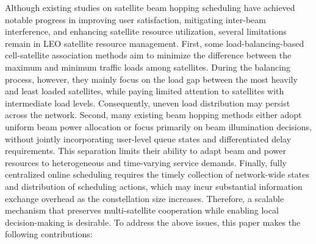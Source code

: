 \documentclass[journal]{IEEEtran}
\newcommand{\revbegin}[1]{\color{revisionblue}\ignorespaces}
\newcommand{\revend}[1]{\color{black}\ignorespaces}
\begin{document}
\revbegin{}Although existing studies on satellite beam hopping scheduling have achieved notable progress in improving user satisfaction, mitigating inter-beam interference, and enhancing satellite resource utilization, several limitations remain in LEO satellite resource management. First, some load-balancing-based cell-satellite association methods aim to minimize the difference between the maximum and minimum traffic loads among satellites. During the balancing process, however, they mainly focus on the load gap between the most heavily and least loaded satellites, while paying limited attention to satellites with intermediate load levels. Consequently, uneven load distribution may persist across the network. Second, many existing beam hopping methods either adopt uniform beam power allocation or focus primarily on beam illumination decisions, without jointly incorporating user-level queue states and differentiated delay requirements. This separation limits their ability to adapt beam and power resources to heterogeneous and time-varying service demands. Finally, fully centralized online scheduling requires the timely collection of network-wide states and distribution of scheduling actions, which may incur substantial information exchange overhead as the constellation size increases. Therefore, a scalable mechanism that preserves multi-satellite cooperation while enabling local decision-making is desirable. To address the above issues, this paper makes the following contributions:\revend{}
\end{document}
